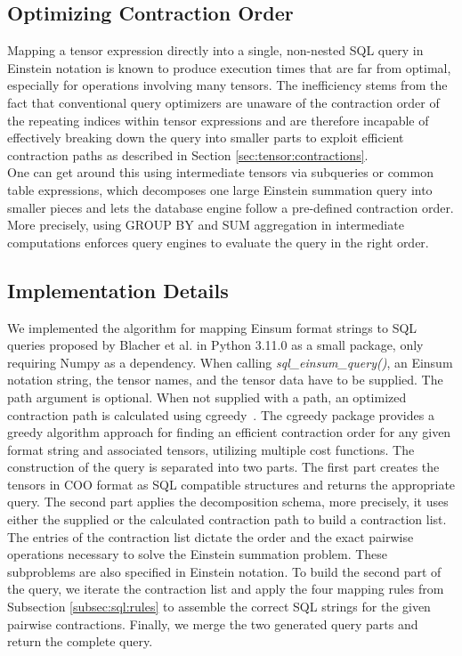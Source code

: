 \subsection{Optimizing Contraction Order}
Mapping a tensor expression directly into a single, non-nested SQL query in Einstein
notation is known to produce execution times that are far from optimal, especially for operations
involving many tensors. The inefficiency stems from the fact that conventional query optimizers
are unaware of the contraction order of the repeating indices within tensor expressions and are
therefore incapable of effectively breaking down the query into smaller parts to exploit efficient
contraction paths as described in Section \ref{sec:tensor:contractions}.\\
One can get around this using intermediate tensors via subqueries or common table expressions,
which decomposes one large Einstein summation query into smaller pieces and lets the database
engine follow a pre-defined contraction order. More precisely, using GROUP BY and SUM
aggregation in intermediate computations enforces query engines to evaluate the query in the
right order.

\subsection{Implementation Details}
We implemented the algorithm for mapping Einsum format strings to SQL queries proposed by Blacher
et al. in Python 3.11.0 as a small package, only requiring Numpy as a dependency. When
calling \textit{sql\_einsum\_query()}, an Einsum notation string, the tensor names, and the tensor
data have to be supplied. The path argument is optional. When not supplied with a path, an
optimized contraction path is calculated using cgreedy~\cite{cgreedy}. The cgreedy package
provides a greedy algorithm approach for finding an efficient contraction order for any given
format string and associated tensors, utilizing multiple cost functions. The construction of the
query is separated into two parts. The first part creates the tensors in COO format as SQL
compatible structures and returns the appropriate query. The second part applies the decomposition
schema, more precisely, it uses either the supplied or the calculated contraction path to build a
contraction list. The entries of the contraction list dictate the order and the exact pairwise
operations necessary to solve the Einstein summation problem. These subproblems are also specified
in Einstein notation. To build the second part of the query, we iterate the contraction list and
apply the four mapping rules from Subsection \ref{subsec:sql:rules} to assemble the correct SQL
strings for the given pairwise contractions. Finally, we merge the two generated query parts and
return the complete query.

